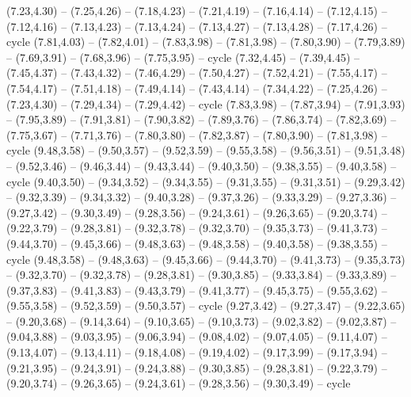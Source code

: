 \expandafter\def\csname geo:gebiet:JOR\endcsname{
  (7.23,4.30) -- (7.25,4.26) -- (7.18,4.23) -- (7.21,4.19) -- (7.16,4.14) -- (7.12,4.15) -- (7.12,4.16) -- (7.13,4.23) -- (7.13,4.24) -- (7.13,4.27) -- (7.13,4.28) -- (7.17,4.26) -- cycle}
\expandafter\def\csname geo:gebiet:ARE\endcsname{
  (7.81,4.03) -- (7.82,4.01) -- (7.83,3.98) -- (7.81,3.98) -- (7.80,3.90) -- (7.79,3.89) -- (7.69,3.91) -- (7.68,3.96) -- (7.75,3.95) -- cycle}
\expandafter\def\csname geo:gebiet:QAT\endcsname{
  }
\expandafter\def\csname geo:gebiet:KWT\endcsname{
  }
\expandafter\def\csname geo:gebiet:IRQ\endcsname{
  (7.32,4.45) -- (7.39,4.45) -- (7.45,4.37) -- (7.43,4.32) -- (7.46,4.29) -- (7.50,4.27) -- (7.52,4.21) -- (7.55,4.17) -- (7.54,4.17) -- (7.51,4.18) -- (7.49,4.14) -- (7.43,4.14) -- (7.34,4.22) -- (7.25,4.26) -- (7.23,4.30) -- (7.29,4.34) -- (7.29,4.42) -- cycle}
\expandafter\def\csname geo:gebiet:OMN\endcsname{
  (7.83,3.98) -- (7.87,3.94) -- (7.91,3.93) -- (7.95,3.89) -- (7.91,3.81) -- (7.90,3.82) -- (7.89,3.76) -- (7.86,3.74) -- (7.82,3.69) -- (7.75,3.67) -- (7.71,3.76) -- (7.80,3.80) -- (7.82,3.87) -- (7.80,3.90) -- (7.81,3.98) -- cycle}
\expandafter\def\csname geo:gebiet:VUT\endcsname{
  }
\expandafter\def\csname geo:gebiet:KHM\endcsname{
  (9.48,3.58) -- (9.50,3.57) -- (9.52,3.59) -- (9.55,3.58) -- (9.56,3.51) -- (9.51,3.48) -- (9.52,3.46) -- (9.46,3.44) -- (9.43,3.44) -- (9.40,3.50) -- (9.38,3.55) -- (9.40,3.58) -- cycle}
\expandafter\def\csname geo:gebiet:THA\endcsname{
  (9.40,3.50) -- (9.34,3.52) -- (9.34,3.55) -- (9.31,3.55) -- (9.31,3.51) -- (9.29,3.42) -- (9.32,3.39) -- (9.34,3.32) -- (9.40,3.28) -- (9.37,3.26) -- (9.33,3.29) -- (9.27,3.36) -- (9.27,3.42) -- (9.30,3.49) -- (9.28,3.56) -- (9.24,3.61) -- (9.26,3.65) -- (9.20,3.74) -- (9.22,3.79) -- (9.28,3.81) -- (9.32,3.78) -- (9.32,3.70) -- (9.35,3.73) -- (9.41,3.73) -- (9.44,3.70) -- (9.45,3.66) -- (9.48,3.63) -- (9.48,3.58) -- (9.40,3.58) -- (9.38,3.55) -- cycle}
\expandafter\def\csname geo:gebiet:LAO\endcsname{
  (9.48,3.58) -- (9.48,3.63) -- (9.45,3.66) -- (9.44,3.70) -- (9.41,3.73) -- (9.35,3.73) -- (9.32,3.70) -- (9.32,3.78) -- (9.28,3.81) -- (9.30,3.85) -- (9.33,3.84) -- (9.33,3.89) -- (9.37,3.83) -- (9.41,3.83) -- (9.43,3.79) -- (9.41,3.77) -- (9.45,3.75) -- (9.55,3.62) -- (9.55,3.58) -- (9.52,3.59) -- (9.50,3.57) -- cycle}
\expandafter\def\csname geo:gebiet:MMR\endcsname{
  (9.27,3.42) -- (9.27,3.47) -- (9.22,3.65) -- (9.20,3.68) -- (9.14,3.64) -- (9.10,3.65) -- (9.10,3.73) -- (9.02,3.82) -- (9.02,3.87) -- (9.04,3.88) -- (9.03,3.95) -- (9.06,3.94) -- (9.08,4.02) -- (9.07,4.05) -- (9.11,4.07) -- (9.13,4.07) -- (9.13,4.11) -- (9.18,4.08) -- (9.19,4.02) -- (9.17,3.99) -- (9.17,3.94) -- (9.21,3.95) -- (9.24,3.91) -- (9.24,3.88) -- (9.30,3.85) -- (9.28,3.81) -- (9.22,3.79) -- (9.20,3.74) -- (9.26,3.65) -- (9.24,3.61) -- (9.28,3.56) -- (9.30,3.49) -- cycle}
